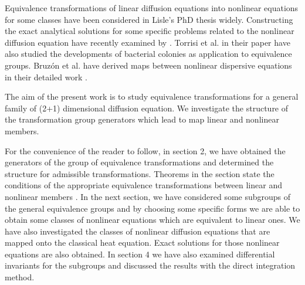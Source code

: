 \documentclass[a4paper]{article}
\begin{document}
Equivalence transformations of  linear diffusion equations into  nonlinear equations for some classes have   been considered in Lisle's PhD thesis \cite{lisle1992equivalence} widely. Constructing the exact analytical solutions for some specific problems related to the nonlinear diffusion equation have recently examined by  \cite{ivanova2010lie,torrisi2007class,popovych2004new}. Torrisi et al.  in their paper \cite{torrisi2007class} have also studied the developments of bacterial colonies as application to  equivalence groups. Bruz{\'o}n et al. have derived maps between nonlinear dispersive equations in their detailed work \cite{bruzon2012some}.
 \par
 The aim of the present work is to study equivalence transformations
for a general family of (2+1) dimensional diffusion
equation. We investigate the structure of the transformation group generators which lead to map linear and
nonlinear members. 
\par
For the convenience of the reader to follow, in section 2,  we
have obtained the generators of the group of equivalence transformations and   determined the  structure   for admissible transformations. Theorems in the section  state the conditions of  the appropriate equivalence  transformations   between linear and nonlinear members . In the next
section, we have considered some subgroups of the general equivalence groups and  by choosing some specific forms we
are able to obtain some classes of nonlinear equations which are
equivalent to linear ones. We have also investigated the classes of  nonlinear diffusion equations that are mapped onto the classical heat equation. Exact solutions for those nonlinear equations are also obtained. In section 4 we have also examined
differential invariants for the subgroups and discussed the results with the direct integration method.
\end{document}
